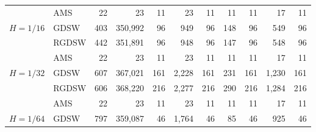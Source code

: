 \begin{table}[H]
\begin{tabular}{llrrrrrrrrr}
\cline{2-11}
\bfseries  & AMS & 22 & {\cellcolor[HTML]{405FE5}} \color[HTML]{F1F1F1} 23 & 11 & {\cellcolor[HTML]{405FE5}} \color[HTML]{F1F1F1} 23 & 11 & {\cellcolor[HTML]{E2E4FB}} \color[HTML]{000000} 11 & 11 & {\cellcolor[HTML]{91A1F0}} \color[HTML]{F1F1F1} 17 & 11 \\
\cline{1-11} \cline{2-11}
\multirow[c]{3}{*}{\bfseries $H=1/16$} & GDSW & 403 & {\cellcolor[HTML]{E2E4FB}} \color[HTML]{000000} 350,992 & 96 & {\cellcolor[HTML]{ACB8F4}} \color[HTML]{000000} 949 & 96 & {\cellcolor[HTML]{768BEC}} \color[HTML]{F1F1F1} 148 & 96 & {\cellcolor[HTML]{405FE5}} \color[HTML]{F1F1F1} 549 & 96 \\
\cline{2-11}
\bfseries  & RGDSW & 442 & {\cellcolor[HTML]{E2E4FB}} \color[HTML]{000000} 351,891 & 96 & {\cellcolor[HTML]{ACB8F4}} \color[HTML]{000000} 948 & 96 & {\cellcolor[HTML]{768BEC}} \color[HTML]{F1F1F1} 147 & 96 & {\cellcolor[HTML]{405FE5}} \color[HTML]{F1F1F1} 548 & 96 \\
\cline{2-11}
\bfseries  & AMS & 22 & {\cellcolor[HTML]{405FE5}} \color[HTML]{F1F1F1} 23 & 11 & {\cellcolor[HTML]{405FE5}} \color[HTML]{F1F1F1} 23 & 11 & {\cellcolor[HTML]{E2E4FB}} \color[HTML]{000000} 11 & 11 & {\cellcolor[HTML]{91A1F0}} \color[HTML]{F1F1F1} 17 & 11 \\
\cline{1-11} \cline{2-11}
\multirow[c]{3}{*}{\bfseries $H=1/32$} & GDSW & 607 & {\cellcolor[HTML]{E2E4FB}} \color[HTML]{000000} 367,021 & 161 & {\cellcolor[HTML]{ACB8F4}} \color[HTML]{000000} 2,228 & 161 & {\cellcolor[HTML]{405FE5}} \color[HTML]{F1F1F1} 231 & 161 & {\cellcolor[HTML]{768BEC}} \color[HTML]{F1F1F1} 1,230 & 161 \\
\cline{2-11}
\bfseries  & RGDSW & 606 & {\cellcolor[HTML]{E2E4FB}} \color[HTML]{000000} 368,220 & 216 & {\cellcolor[HTML]{ACB8F4}} \color[HTML]{000000} 2,277 & 216 & {\cellcolor[HTML]{405FE5}} \color[HTML]{F1F1F1} 290 & 216 & {\cellcolor[HTML]{768BEC}} \color[HTML]{F1F1F1} 1,284 & 216 \\
\cline{2-11}
\bfseries  & AMS & 22 & {\cellcolor[HTML]{405FE5}} \color[HTML]{F1F1F1} 23 & 11 & {\cellcolor[HTML]{405FE5}} \color[HTML]{F1F1F1} 23 & 11 & {\cellcolor[HTML]{E2E4FB}} \color[HTML]{000000} 11 & 11 & {\cellcolor[HTML]{91A1F0}} \color[HTML]{F1F1F1} 17 & 11 \\
\cline{1-11} \cline{2-11}
\multirow[c]{3}{*}{\bfseries $H=1/64$} & GDSW & 797 & {\cellcolor[HTML]{E2E4FB}} \color[HTML]{000000} 359,087 & 46 & {\cellcolor[HTML]{ACB8F4}} \color[HTML]{000000} 1,764 & 46 & {\cellcolor[HTML]{768BEC}} \color[HTML]{F1F1F1} 85 & 46 & {\cellcolor[HTML]{405FE5}} \color[HTML]{F1F1F1} 925 & 46 \\

\end{tabular}
\end{table}
